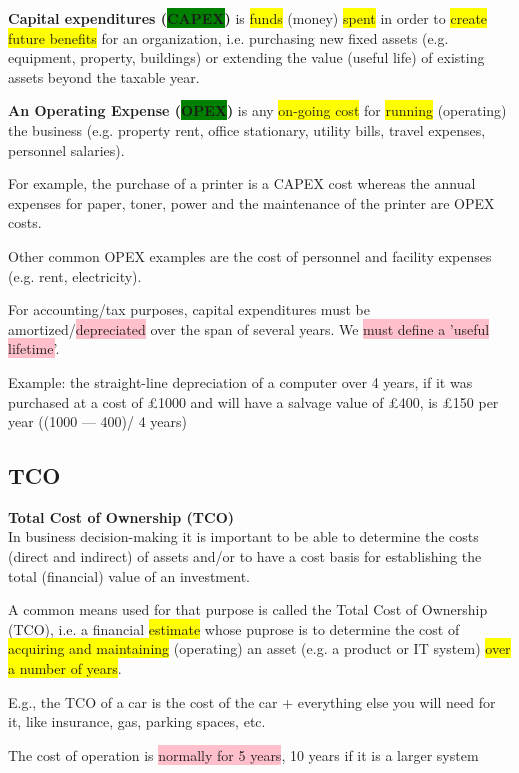 \documentclass[]{project_plan}
\begin{document}
\textbf{Capital expenditures (\colorbox{green}{CAPEX})} is \colorbox{yellow}{funds} (money) \colorbox{yellow}{spent} in order to \colorbox{yellow}{create future benefits} for an organization, i.e.
purchasing new fixed assets (e.g. equipment, property, buildings) or extending the value (useful life) of existing assets
beyond the taxable year.

\textbf{An Operating Expense (\colorbox{green}{OPEX})} is any \colorbox{yellow}{on-going cost} for \colorbox{yellow}{running} (operating) the business (e.g. property rent, office
stationary, utility bills, travel expenses, personnel salaries).

For example, the purchase of a printer is a CAPEX cost whereas the annual expenses for paper, toner, power and the
maintenance of the printer are OPEX costs.

Other common OPEX examples are the cost of personnel and facility
expenses (e.g. rent, electricity).

\newpage

For accounting/tax purposes, capital expenditures must be amortized/\colorbox{pink}{depreciated} over
the span of several years. We \colorbox{pink}{must define a 'useful lifetime'}.

Example: the straight-line depreciation of a computer over 4 years, if it was purchased at a cost
of £1000 and will have a salvage value of £400, is £150 per year ((1000 — 400)/ 4 years)

\subsection{TCO}

\textbf{Total Cost of Ownership (TCO)}\\
In business decision-making it is important to be able to determine the costs (direct and indirect) of
assets and/or to have a cost basis for establishing the total (financial) value of an investment.

A common means used for that purpose is called the Total Cost of Ownership (TCO), i.e. a financial
\colorbox{yellow}{estimate} whose puprose is to determine the cost of \colorbox{yellow}{acquiring and maintaining} (operating) an asset
(e.g. a product or IT system) \colorbox{yellow}{over a number of years}.

E.g., the TCO of a car is the cost of the car + everything else you will need for it,
like insurance, gas, parking spaces, etc.

The cost of operation is \colorbox{pink}{normally for 5 years}, 10 years if it is a larger system
\end{document}
